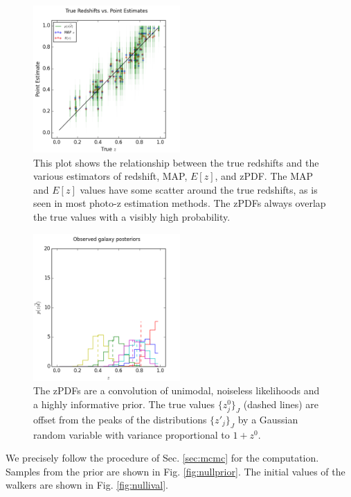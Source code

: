 \documentclass[preprint]{aastex}
\begin{document}
\begin{figure}
\includegraphics[width=0.5\textwidth]{null/truevmap.png}
\caption{This plot shows the relationship between the true redshifts and the 
various estimators of redshift, MAP, $E[z]$, and zPDF.  The MAP and $E[z]$ 
values have some scatter around the true redshifts, as is seen in most photo-z 
estimation methods.  The zPDFs always overlap the true values with a visibly 
high probability.}
\label{fig:nullcat}
\end{figure}

\begin{figure}
\includegraphics[width=0.5\textwidth]{null/samplepzs.png}
\caption{The zPDFs are a convolution of unimodal, noiseless likelihoods and a 
highly informative prior.  The true values $\{z^{0}_{j}\}_{J}$ (dashed lines) 
are offset from the peaks of the distributions $\{z'_{j}\}_{J}$ by a Gaussian 
random variable with variance proportional to $1+z^{0}$.}
\label{fig:nullpzs}
\end{figure}

We precisely follow the procedure of Sec. \ref{sec:mcmc} for the computation.  
Samples from the prior are shown in Fig. \ref{fig:nullprior}.  The initial 
values of the walkers are shown in Fig. \ref{fig:nullival}.
\end{document}
